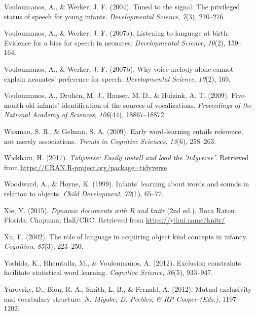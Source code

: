 \documentclass[english,floatsintext,man]{apa6}
\theoremstyle{definition}
\theoremstyle{definition}
\theoremstyle{definition}
\theoremstyle{remark}
\begin{document}
\hypertarget{ref-vouloumanos2004tuned}{}
Vouloumanos, A., \& Werker, J. F. (2004). Tuned to the signal: The
privileged status of speech for young infants. \emph{Developmental
Science}, \emph{7}(3), 270--276.

\hypertarget{ref-vouloumanos2007listening}{}
Vouloumanos, A., \& Werker, J. F. (2007a). Listening to language at
birth: Evidence for a bias for speech in neonates. \emph{Developmental
Science}, \emph{10}(2), 159--164.

\hypertarget{ref-vouloumanos2007voice}{}
Vouloumanos, A., \& Werker, J. F. (2007b). Why voice melody alone cannot
explain neonates' preference for speech. \emph{Developmental Science},
\emph{10}(2), 169.

\hypertarget{ref-vouloumanos2009five}{}
Vouloumanos, A., Druhen, M. J., Hauser, M. D., \& Huizink, A. T. (2009).
Five-month-old infants' identification of the sources of vocalizations.
\emph{Proceedings of the National Academy of Sciences}, \emph{106}(44),
18867--18872.

\hypertarget{ref-waxman2009early}{}
Waxman, S. R., \& Gelman, S. A. (2009). Early word-learning entails
reference, not merely associations. \emph{Trends in Cognitive Sciences},
\emph{13}(6), 258--263.

\hypertarget{ref-R-tidyverse}{}
Wickham, H. (2017). \emph{Tidyverse: Easily install and load the
'tidyverse'}. Retrieved from
\url{https://CRAN.R-project.org/package=tidyverse}

\hypertarget{ref-woodward1999infants}{}
Woodward, A., \& Hoyne, K. (1999). Infants' learning about words and
sounds in relation to objects. \emph{Child Development}, \emph{70}(1),
65--77.

\hypertarget{ref-R-knitr}{}
Xie, Y. (2015). \emph{Dynamic documents with R and knitr} (2nd ed.).
Boca Raton, Florida: Chapman; Hall/CRC. Retrieved from
\url{https://yihui.name/knitr/}

\hypertarget{ref-xu2002role}{}
Xu, F. (2002). The role of language in acquiring object kind concepts in
infancy. \emph{Cognition}, \emph{85}(3), 223--250.

\hypertarget{ref-yoshida2012exclusion}{}
Yoshida, K., Rhemtulla, M., \& Vouloumanos, A. (2012). Exclusion
constraints facilitate statistical word learning. \emph{Cognitive
Science}, \emph{36}(5), 933--947.

\hypertarget{ref-yurovsky2012mutual}{}
Yurovsky, D., Bion, R. A., Smith, L. B., \& Fernald, A. (2012). Mutual
exclusivity and vocabulary structure. \emph{N. Miyake, D. Peebles, \& RP
Cooper (Eds.)}, 1197--1202.
\end{document}
